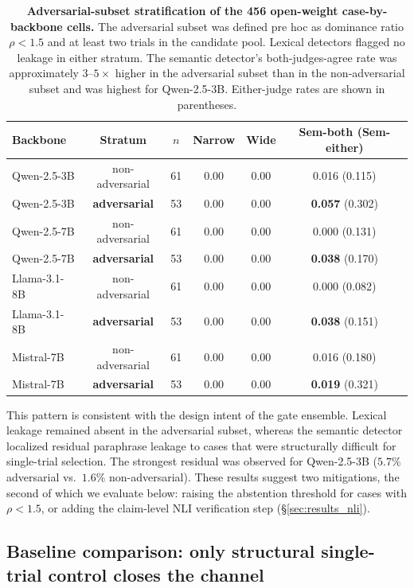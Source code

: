 \documentclass[pdflatex,Numbered]{sn-jnl}
\theoremstyle{plain}
\begin{document}
\begin{table}[!htbp]
\centering
\caption{\textbf{Adversarial-subset stratification of the 456 open-weight case-by-backbone cells.} The adversarial subset was defined pre hoc as dominance ratio $\rho < 1.5$ and at least two trials in the candidate pool. Lexical detectors flagged no leakage in either stratum. The semantic detector's both-judges-agree rate was approximately $3$--$5\times$ higher in the adversarial subset than in the non-adversarial subset and was highest for Qwen-2.5-3B. Either-judge rates are shown in parentheses.}
\label{tab:adv_subset}
\small
\setlength{\tabcolsep}{4pt}
\begin{tabular}{l c c c c c}
\toprule
Backbone & Stratum & $n$ & Narrow & Wide & Sem-both (Sem-either) \\
\midrule
Qwen-2.5-3B   & non-adversarial & 61 & 0.00 & 0.00 & 0.016 (0.115) \\
Qwen-2.5-3B   & \textbf{adversarial} & 53 & 0.00 & 0.00 & \textbf{0.057} (0.302) \\
\midrule
Qwen-2.5-7B   & non-adversarial & 61 & 0.00 & 0.00 & 0.000 (0.131) \\
Qwen-2.5-7B   & \textbf{adversarial} & 53 & 0.00 & 0.00 & \textbf{0.038} (0.170) \\
\midrule
Llama-3.1-8B  & non-adversarial & 61 & 0.00 & 0.00 & 0.000 (0.082) \\
Llama-3.1-8B  & \textbf{adversarial} & 53 & 0.00 & 0.00 & \textbf{0.038} (0.151) \\
\midrule
Mistral-7B    & non-adversarial & 61 & 0.00 & 0.00 & 0.016 (0.180) \\
Mistral-7B    & \textbf{adversarial} & 53 & 0.00 & 0.00 & \textbf{0.019} (0.321) \\
\bottomrule
\end{tabular}
\end{table}

This pattern is consistent with the design intent of the gate ensemble. Lexical leakage remained absent in the adversarial subset, whereas the semantic detector localized residual paraphrase leakage to cases that were structurally difficult for single-trial selection. The strongest residual was observed for Qwen-2.5-3B ($5.7\%$ adversarial vs.\ $1.6\%$ non-adversarial). These results suggest two mitigations, the second of which we evaluate below: raising the abstention threshold for cases with $\rho < 1.5$, or adding the claim-level NLI verification step (\S\ref{sec:results_nli}).

\subsection{Baseline comparison: only structural single-trial control closes the channel}
\label{sec:results_baselines}
\end{document}
